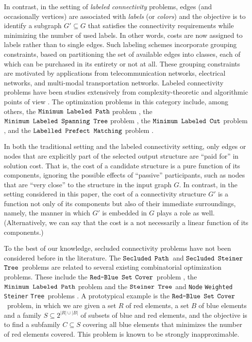 \documentclass[12pt]{article}
\newcommand{\PS}[0]{$\mbox{\tt Secluded}$ $\mbox{\tt Steiner}$
$\mbox{\tt Tree}$}
\newcommand{\PP}[0]{$\mbox{\tt Secluded}$ $\mbox{\tt Path}$}
\newcommand{\MLP}[0]{\mbox{\tt Minimum Labeled Path}}
\newcommand{\MLST}[0]{\mbox{\tt Minimum Labeled Spanning Tree}}
\newcommand{\MLC}[0]{\mbox{\tt Minimum Labeled Cut}}
\newcommand{\LPM}[0]{\mbox{\tt Labelled Prefect Matching}}
\newcommand{\Steiner}[0]{\mbox{\tt Steiner Tree}}
\newcommand{\NodeSteiner}[0]{\mbox{\tt Node} \mbox{\tt Weighted}
\mbox{\tt Steiner} \mbox{\tt Tree}}
\newcommand{\RBSC}[0]{$\mbox{\tt Red-Blue}$ $\mbox{\tt Set}$ $\mbox{\tt Cover}$}
\begin{document}
In contrast, in the setting of \emph{labeled connectivity} problems, edges (and occasionally vertices) are associated with \emph{labels} (or \emph{colors}) and the objective is to identify a subgraph $G' \subseteq G$ that satisfies the connectivity requirements while minimizing the number of used labels. In other words, costs are now assigned to labels rather than to single edges. Such labeling schemes incorporate grouping constraints, based on partitioning the set of available edges into classes, each of which can be purchased in its entirety or not at all. These grouping constraints are motivated by applications from telecommunication networks, electrical networks, and multi-modal transportation networks. Labeled connectivity problems have been studies extensively from complexity-theoretic and algorithmic points of view \cite{DS99,YuanVJ05,HassinMS07,FellowsGK10}. The optimization problems in this category include, among others, the $\MLP$ problem \cite{HassinMS07,YuanVJ05}, the $\MLST$ problem \cite{KrumkeW98,HassinMS07}, the $\MLC$ problem \cite{ZhangCTZ11}, and the $\LPM$ problem \cite{Monnot05}.

In both the traditional setting and the labeled connectivity setting, only edges or nodes that are explicitly part of the selected output structure are ``paid for'' in solution cost. That is, the cost of a candidate structure is a pure function of its components, ignoring the possible effects of ``passive'' participants, such as nodes that are ``very close'' to the structure in the input graph $G$.  In contrast, in the setting considered in this paper, the cost of a connectivity structure $G'$ is a function not only of its components but also of their immediate surroundings, namely, the manner in which $G'$ is embedded in $G$ plays a role as well. (Alternatively, we can say that the cost is a not necessarily a linear function of its components.)

To the best of our knowledge, secluded connectivity problems have not been considered before in the literature. The \PP\ and \PS\  problems are related to several existing combinatorial optimization problems. These include the \RBSC\ problem \cite{CarrDKM00,Peleg07}, the $\MLP$  problem \cite{HassinMS07,YuanVJ05} and the $\Steiner$ \cite{Kar72} and \NodeSteiner\ problems \cite{KleinR95}. A prototypical example is the \RBSC\ problem, in which we are given a set $R$ of red elements, a set $B$ of blue elements and a family $S \subseteq 2^{|R|\cup |B|}$ of subsets of blue and red elements, and the objective is to find a subfamily $C \subseteq S$ covering all blue elements that minimizes the number of red elements covered. This problem is known to be strongly inapproximable.
\end{document}
